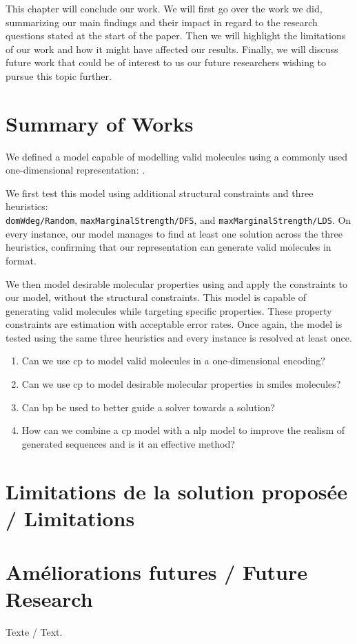 \documentclass[../Document.tex]{subfiles}
\begin{document}
\label{chap:conclusion}
This chapter will conclude our work.
We will first go over the work we did, summarizing our main findings and their impact in regard to the research questions stated at the start of the paper.
Then we will highlight the limitations of our work and how it might have affected our results.
Finally, we will discuss future work that could be of interest to us our future researchers wishing to pursue this topic further.

\section{Summary of Works}
\label{sec:conc/summary}
We defined a model capable of modelling valid molecules using a commonly used one-dimensional representation: \smiles.

We first test this model using additional structural constraints and three heuristics:\\ \texttt{domWdeg/Random}, \texttt{maxMarginalStrength/DFS}, and \texttt{maxMarginalStrength/LDS}.
On every instance, our model manages to find at least one solution across the three heuristics, confirming that our representation can generate valid molecules in \smiles format.

We then model desirable molecular properties using \cp and apply the constraints to our model, without the structural constraints.
This model is capable of generating valid molecules while targeting specific properties.
These property constraints are estimation with acceptable error rates.
Once again, the model is tested using the same three heuristics and every instance is resolved at least once.



\begin{enumerate}
    \item Can we use \acrshort{cp} to model valid molecules in a one-dimensional encoding?
    \item Can we use \acrshort{cp} to model desirable molecular properties in \acrshort{smiles} molecules?
    \item Can \acrlong{bp} be used to better guide a solver towards a solution?
    \item How can we combine a \acrshort{cp} model with a \acrshort{nlp} model to improve the realism of generated sequences and is it an effective method?
\end{enumerate}

\section{Limitations de la solution proposée / Limitations}
\label{sec:conc/limitations}

\section{Améliorations futures / Future Research}
\label{sec:conc/future}
Texte / Text.
\end{document}

